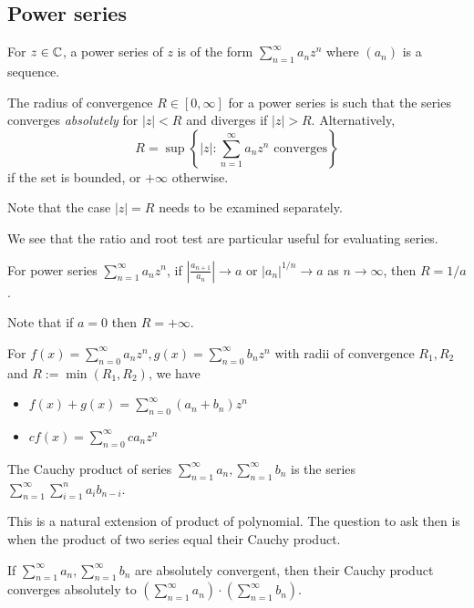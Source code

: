 \documentclass[11pt]{article}
\begin{document}
\subsection{Power series}

\begin{definition}
  For \(z\in\mathbb{C}\), a power series of \(z\) is of the form \(\sum_{n=1}^\infty a_nz^n\) where \((a_n)\) is a sequence.
\end{definition}

\begin{definition}
  The radius of convergence \(R\in [0,\infty]\) for a power series is such that the series converges \emph{absolutely} for \(|z|<R\) and diverges if \(|z|>R\). Alternatively,
  \[R=\sup\left\{|z|:\sum_{n=1}^\infty a_nz^n \text{ converges}\right\}\]
  if the set is bounded, or \(+\infty\) otherwise.
\end{definition}
Note that the case \(|z|=R\) needs to be examined separately.

We see that the ratio and root test are particular useful for evaluating series.
\begin{theorem}
  For power series \(\sum_{n=1}^\infty a_nz^n\), if \(|\frac{a_{n+1}}{a_n}| \to a\) or \(|a_n|^{1/n}\to a\) as \(n\to\infty\), then \(R=1/a\).
\end{theorem}
Note that if \(a=0\) then \(R=+\infty\).

\begin{proposition}
  For \(f(x)=\sum_{n=0}^{\infty}a_nz^n, g(x)=\sum_{n=0}^{\infty}b_nz^n\) with radii of convergence \(R_1,R_2\) and \(R:=\min(R_1,R_2)\), we have
  \begin{itemize}
    \item \(f(x)+g(x)=\sum_{n=0}^{\infty}(a_n+b_n)z^n\)
    \item \(cf(x)=\sum_{n=0}^{\infty}ca_nz^n\)
  \end{itemize}
\end{proposition}

\begin{definition}
  The Cauchy product of series \(\sum_{n=1}^\infty a_n,\sum_{n=1}^\infty b_n\) is the series \(\sum_{n=1}^\infty \sum_{i=1}^n a_ib_{n-i}\).
\end{definition}
This is a natural extension of product of polynomial. The question to ask then is when the product of two series equal their Cauchy product.

\begin{theorem}
  If \(\sum_{n=1}^\infty a_n,\sum_{n=1}^\infty b_n\) are absolutely convergent, then their Cauchy product converges absolutely to \((\sum_{n=1}^\infty a_n)\cdot(\sum_{n=1}^\infty b_n)\).
\end{theorem}
\end{document}

